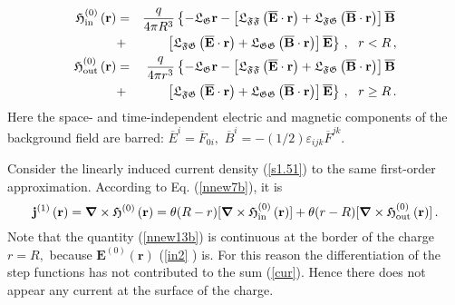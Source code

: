 \documentclass[12pt]{article}
\begin{document}
\begin{eqnarray}
\mathbf{\mathfrak{H}}_{\mathrm{in}}^{\left( 0\right) }\left( \mathbf{r}%
\right) &=&\frac{q}{4\pi R^{3}}\left\{ -\mathfrak{L}_{\mathfrak{G}}\mathbf{r}%
-\left[ \mathfrak{L}_{\mathfrak{FF}}\left( \overline{\mathbf{E}}\cdot 
\mathbf{r}\right) +\mathfrak{L}_{\mathfrak{FG}}\left( \mathbf{\overline{B}}%
\cdot \mathbf{r}\right) \right] \mathbf{\overline{B}}\right.  \notag \\
&+&\left. \left[ \mathfrak{L}_{\mathfrak{FG}}\left( \overline{\mathbf{E}}%
\cdot \mathbf{r}\right) +\mathfrak{L}_{\mathfrak{GG}}\left( \mathbf{%
\overline{B}}\cdot \mathbf{r}\right) \right] \overline{\mathbf{E}}\right\}
\,,\ \ r<R\,,  \label{Hin} \\
\mathbf{\mathfrak{H}}_{\mathrm{out}}^{\left( 0\right) }\left( \mathbf{r}%
\right) &=&\frac{q}{4\pi r^{3}}\left\{ -\mathfrak{L}_{\mathfrak{G}}\mathbf{r}%
-\left[ \mathfrak{L}_{\mathfrak{FF}}\left( \overline{\mathbf{E}}\cdot 
\mathbf{r}\right) +\mathfrak{L}_{\mathfrak{FG}}\left( \mathbf{\overline{B}}%
\cdot \mathbf{r}\right) \right] \mathbf{\overline{B}}\right.  \notag \\
&+&\left. \left[ \mathfrak{L}_{\mathfrak{FG}}\left( \overline{\mathbf{E}}%
\cdot \mathbf{r}\right) +\mathfrak{L}_{\mathfrak{GG}}\left( \mathbf{%
\overline{B}}\cdot \mathbf{r}\right) \right] \overline{\mathbf{E}}\right\}
\,,\ \ r\geq R\,.  \label{Hout}
\end{eqnarray}%
Here the space- and time-independent electric and magnetic components of the
background field are barred: $\overline{E}^{i}=\overline{F}_{0i},$ $%
\overline{B}^{i}=-\left( 1/2\right) \varepsilon _{ijk}\overline{F}^{jk}$.

Consider the linearly induced current density (\ref{s1.51}) to the same
first-order approximation. According to Eq. (\ref{nnew7b}), it is%
\begin{equation}
\mathbf{j}^{\left( 1\right) }\left( \mathbf{r}\right) =\boldsymbol{\nabla }%
\times \mathbf{\mathfrak{H}}^{(0)}\left( \mathbf{r}\right) =\theta (R-r)[%
\boldsymbol{\nabla }\times \mathbf{\mathfrak{H}}_{\mathrm{in}}^{(0)}\left( 
\mathbf{r}\right) ]+\theta (r-R)[\boldsymbol{\nabla }\times \mathbf{%
\mathfrak{H}}_{\mathrm{out}}^{(0)}\left( \mathbf{r}\right) ]\,.  \label{cur}
\end{equation}%
Note that the quantity (\ref{nnew13b}) is continuous at the border of the
charge $r=R,$ because $\mathbf{E}^{(0)}\left( \mathbf{r}\right) $ (\ref{in2}%
) is. For this reason the differentiation of the step functions has not
contributed to the sum (\ref{cur}). Hence there does not appear any current
at the surface of the charge.
\end{document}
